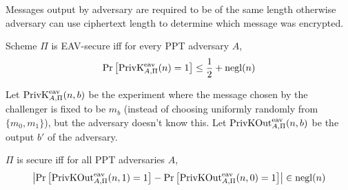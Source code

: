 Messages output by adversary are required to be of the same length
otherwise adversary can use ciphertext length to determine which message was encrypted.

\begin{definition}
Scheme $\Pi$ is EAV-secure iff for every PPT adversary $A$,
\[ \Pr\left[ \PrivKExpt{eav}{A,\Pi}(n) = 1\right]
\le \frac{1}{2} + \operatorname{negl}(n) \]
\end{definition}

\begin{definition}
Let $\PrivKExpt{eav}{A,\Pi}(n, b)$ be the experiment where the message chosen by the challenger
is fixed to be $m_b$ (instead of choosing uniformly randomly from $\{m_0, m_1\}$),
but the adversary doesn't know this.
Let $\PrivKOut{eav}{A,\Pi}(n, b)$ be the output $b'$ of the adversary.
\end{definition}

\begin{theorem}
$\Pi$ is secure iff for all PPT adversaries $A$,
\[ \left| \Pr\left[ \PrivKOut{eav}{A,\Pi}(n, 1) = 1 \right]
- \Pr\left[ \PrivKOut{eav}{A,\Pi}(n, 0) = 1 \right] \right| \in \operatorname{negl}(n) \]
\end{theorem}


